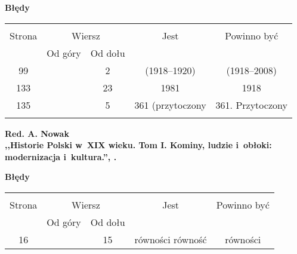 \documentclass[a4paper,11pt]{article}
\newcommand{\spaceOne}{2em}
\newcommand{\tb}{\textbf}
\newcommand{\Center}[1]{\begin{center} #1 \end{center}}
\newcommand{\CenterTB}[1]{\Center{\tb{#1}}}
\newcommand{\Str}[1]{\tb{Str. #1.}}
\newcommand{\Work}[1]{ \begin{center} {\large \tb{#1}} \end{center} }
\begin{document}
\CenterTB{Błędy}
\begin{center}
  \begin{tabular}{|c|c|c|c|c|}
    \hline
    & \multicolumn{2}{c|}{} & & \\
    Strona & \multicolumn{2}{c|}{Wiersz}& Jest & Powinno być \\ \cline{2-3}
    & Od góry & Od dołu &  &  \\ \hline
    99 & & 2 & (1918--1920) & (1918--2008) \\
    133 & & 23 & 1981 & 1918 \\
    135 & & 5 & 361 (przytoczony & 361. Przytoczony \\
    & & & & \\ \hline
  \end{tabular}
\end{center}

\vspace{\spaceOne}



\Work{
  Red. A. Nowak \\
  ,,Historie Polski w~XIX wieku. Tom I. Kominy, ludzie i~obłoki: \\
  modernizacja i~kultura.'', \cite{HPXIX1}.}


\CenterTB{Błędy}
\begin{center}
  \begin{tabular}{|c|c|c|c|c|}
    \hline
    & \multicolumn{2}{c|}{} & & \\
    Strona & \multicolumn{2}{c|}{Wiersz}& Jest & Powinno być \\ \cline{2-3}
    & Od góry & Od dołu &  &  \\ \hline
    16 & & 15 & równości równość & równości \\ \hline
  \end{tabular}
\end{center}
\end{document}
